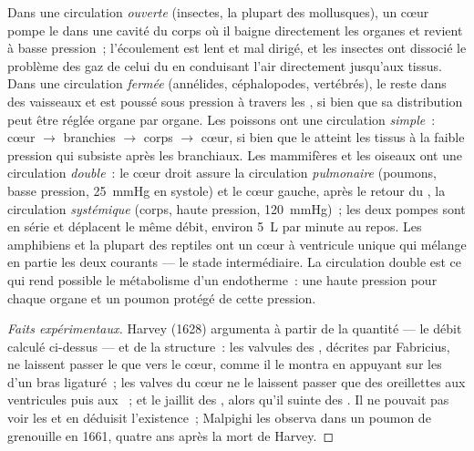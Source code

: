 \begin{definition}\label{def:b2:blood-circulation:circuits}
Dans une circulation \emph{ouverte} (insectes, la plupart des
mollusques), un cœur pompe le  dans une cavité du corps où il baigne
directement les organes et revient à basse pression~; l'écoulement est
lent et mal dirigé, et les insectes ont dissocié le problème des gaz de
celui du  en conduisant l'air directement jusqu'aux tissus. Dans une
circulation \emph{fermée} (annélides, céphalopodes, vertébrés), le 
reste dans des vaisseaux et est poussé sous pression à travers les
, si bien que sa distribution peut être réglée organe par
organe. Les poissons ont une circulation \emph{simple}~: cœur
$\to$ branchies $\to$ corps $\to$ cœur, si bien que le  atteint les
tissus à la faible pression qui subsiste après les 
branchiaux. Les mammifères et les oiseaux ont une circulation
\emph{double}~: le cœur droit assure la circulation \emph{pulmonaire}
(poumons, basse pression, \qty{25}{mmHg} en systole) et le cœur gauche,
après le retour du , la circulation \emph{systémique} (corps, haute
pression, \qty{120}{mmHg})~; les deux pompes sont en série et déplacent
le même débit, environ \qty{5}{L} par minute au repos. Les amphibiens et
la plupart des reptiles ont un cœur à ventricule unique qui mélange en
partie les deux courants --- le stade intermédiaire. La circulation
double est ce qui rend possible le métabolisme d'un endotherme~: une
haute pression pour chaque organe et un poumon protégé de cette
pression.
\end{definition}
\begin{proof}[Faits expérimentaux]
Harvey (1628) argumenta à partir de la quantité --- le débit calculé
ci-dessus --- et de la structure~: les valvules des , décrites par
Fabricius, ne laissent passer le  que vers le cœur, comme il le
montra en appuyant sur les  d'un bras ligaturé~; les valves du
cœur ne le laissent passer que des oreillettes aux ventricules puis aux
~; et le  jaillit des , alors qu'il suinte des
. Il ne pouvait pas voir les  et en déduisit
l'existence~; Malpighi les observa dans un poumon de grenouille en 1661,
quatre ans après la mort de Harvey.
\end{proof}

